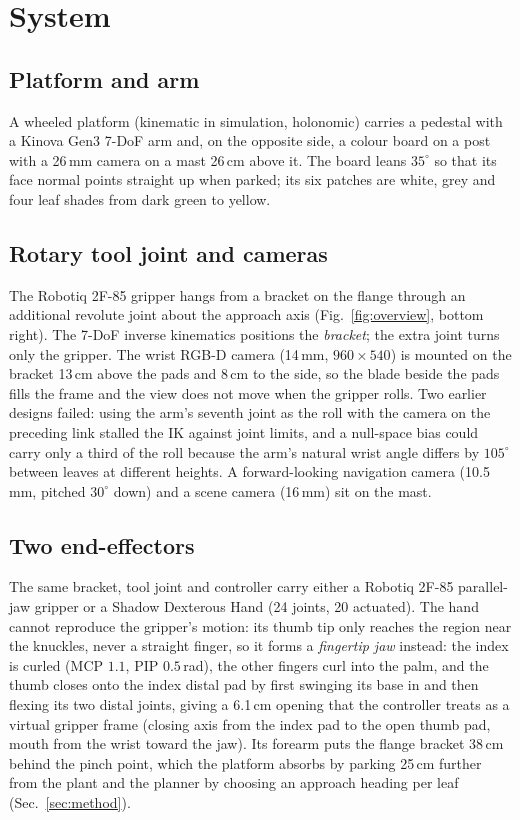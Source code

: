 \documentclass[letterpaper, 10 pt, conference]{ieeeconf}
\begin{document}
\section{System}

\subsection{Platform and arm}
A wheeled platform (kinematic in simulation, holonomic) carries a pedestal with a Kinova
Gen3 7-DoF arm and, on the opposite side, a colour board on a post with a 26\,mm camera on a
mast 26\,cm above it. The board leans $35^\circ$ so that its face normal points straight
up when parked; its six patches are white, grey and four leaf shades from dark green to
yellow.

\subsection{Rotary tool joint and cameras}
The Robotiq 2F-85 gripper hangs from a bracket on the flange through an additional revolute
joint about the approach axis (Fig.~\ref{fig:overview}, bottom right). The 7-DoF inverse
kinematics positions the \emph{bracket}; the extra joint turns only the gripper. The wrist
RGB-D camera (14\,mm, $960{\times}540$) is mounted on the bracket 13\,cm above the pads and
8\,cm to the side, so the blade beside the pads fills the frame and the view does not move
when the gripper rolls. Two earlier designs failed: using the arm's seventh joint as the
roll with the camera on the preceding link stalled the IK against joint limits, and a
null-space bias could carry only a third of the roll because the arm's natural wrist angle
differs by $105^\circ$ between leaves at different heights. A forward-looking navigation
camera (10.5\,mm, pitched $30^\circ$ down) and a scene camera (16\,mm) sit on the mast.

\subsection{Two end-effectors}
The same bracket, tool joint and controller carry either a Robotiq 2F-85 parallel-jaw
gripper or a Shadow Dexterous Hand (24 joints, 20 actuated). The hand cannot reproduce the
gripper's motion: its thumb tip only reaches the region near the knuckles, never a straight
finger, so it forms a \emph{fingertip jaw} instead: the index is curled (MCP $1.1$, PIP
$0.5$\,rad), the other fingers curl into the palm, and the thumb closes onto the index
distal pad by first swinging its base in and then flexing its two distal joints, giving a
6.1\,cm opening that the controller treats as a virtual gripper frame (closing axis from
the index pad to the open thumb pad, mouth from the wrist toward the jaw). Its forearm puts
the flange bracket 38\,cm behind the pinch point, which the platform absorbs by parking
25\,cm further from the plant and the planner by choosing an approach heading per leaf
(Sec.~\ref{sec:method}).
\end{document}
